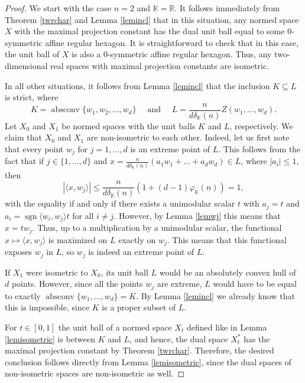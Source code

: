 \documentclass[12pt, reqno]{amsart}
\theoremstyle{definition}
\theoremstyle{remark}
\numberwithin{equation}{section}
\DeclareMathOperator{\absconv}{absconv}
\DeclareMathOperator{\sgn}{sgn}
\begin{document}
\begin{proof}
We start with the case $n=2$ and $\mathbb{K}=\mathbb{R}$. It follows immediately from Theorem \ref{twrchar} and Lemma \ref{lemincl} that in this situation, any normed space $X$ with the maximal projection constant has the dual unit ball equal to some $0$-symmetric affine regular hexagon. It is straightforward to check that in this case, the unit ball of $X$ is also a $0$-symmetric affine regular hexagon. Thus, any two-dimensional real spaces with maximal projection constants are isometric.

In all other situations, it follows from Lemma \ref{lemincl} that the inclusion $K \subseteq L$ is strict, where
$$K=\absconv \{w_1, w_2, \ldots, w_d\} \quad \text{ and } \quad L= \frac{n}{d\delta_{\mathbb{K}}(n)} Z(w_1, \ldots, w_d).$$
Let $X_0$ and $X_1$ be normed spaces with the unit balls $K$ and $L$, respectively. We claim that $X_0$ and $X_1$ are non-isometric to each other. Indeed, let us first note that every point $w_j$ for $j=1, \ldots, d$ is an extreme point of $L$. This follows from the fact that if $j \in \{1, \ldots, d\}$ and $x= \frac{n}{d\delta_{\mathbb{K}}(n)} (a_1w_1 + \ldots + a_dw_d) \in L$, where $|a_i| \leq 1$, then
$$|\langle x, w_j \rangle | \leq \frac{n}{d\delta_{\mathbb{K}}(n)} (1 + (d-1)\varphi_{\mathbb{K}}(n)) =  1, $$
with the equality if and only if there exists a unimodular scalar $t$ with $a_j=t$ and $a_i = \sgn \langle w_i, w_j \rangle t$ for all $i \neq j$. However, by Lemma \ref{lemwj} this means that $x=tw_j$. Thus, up to a multiplication by a unimodular scalar, the functional $x \mapsto \langle x, w_j \rangle $ is maximized on $L$ exactly on $w_j$. This means that this functional exposes $w_j$ in $L$, so $w_j$ is indeed an extreme point of $L$.

If $X_1$ were isometric to $X_0$, its unit ball $L$ would be an absolutely convex hull of $d$ points. However, since all the points $w_j$ are extreme, $L$ would have to be equal to exactly $\absconv \{w_1, \ldots, w_d\} = K$. By Lemma \ref{lemincl} we already know that this is impossible, since $K$ is a proper subset of $L$.

For $t \in [0, 1]$ the unit ball of a normed space $X_t$ defined like in Lemma \ref{lemisometric} is between $K$ and $L$, and hence, the dual space $X^*_t$ has the maximal projection constant by Theorem \ref{twrchar}. Therefore, the desired conclusion follows directly from Lemma \ref{lemisometric}, since the dual spaces of non-isometric spaces are non-isometric as well. 
\end{proof}
\end{document}
